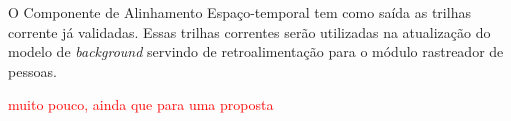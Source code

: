 O Componente de Alinhamento Espaço-temporal tem como saída as trilhas corrente já validadas. Essas trilhas correntes serão utilizadas na atualização do modelo de \textit{background} servindo de retroalimentação para o módulo rastreador de pessoas.


\textcolor{red}{muito pouco, ainda que para uma proposta}

